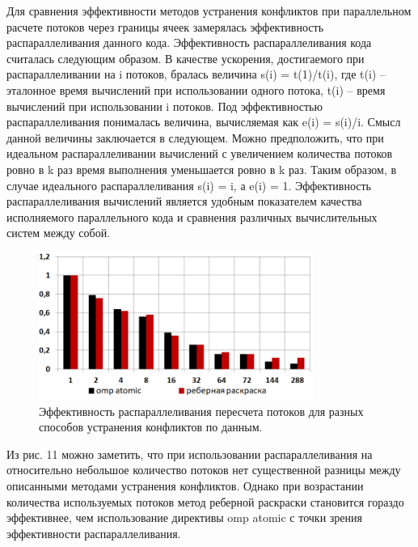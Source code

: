 Для сравнения эффективности методов устранения конфликтов при параллельном расчете потоков через границы ячеек замерялась эффективность распараллеливания данного кода.
Эффективность распараллеливания кода считалась следующим образом. В качестве ускорения, достигаемого при распараллеливании на i потоков, бралась величина s(i) = t(1)/t(i), где t(i) – эталонное время вычислений при использовании одного потока, t(i) – время вычислений при использовании i потоков.
Под эффективностью распараллеливания понималась величина, вычисляемая как e(i) = s(i)/i. Смысл данной величины заключается в следующем. Можно предположить, что при идеальном распараллеливании вычислений с увеличением количества потоков ровно в k раз время выполнения уменьшается ровно в k раз.
Таким образом, в случае идеального распараллеливания s(i) = i, а e(i) = 1. Эффективность распараллеливания вычислений является удобным показателем качества исполняемого параллельного кода и сравнения различных вычислительных систем между собой.

\begin{figure}[ht]
	\centering
		\includegraphics[width=0.8\textwidth]{./pics/text_3_edge_coloring/11-chart.png}
	\caption{Эффективность распараллеливания пересчета потоков для разных способов устранения конфликтов по данным.}
	\label{fig:text_3_edge_coloring_11}
\end{figure}

Из рис. 11 можно заметить, что при использовании распараллеливания на относительно небольшое количество потоков нет существенной разницы между описанными методами устранения конфликтов.
Однако при возрастании количества используемых потоков метод реберной раскраски становится гораздо эффективнее, чем использование директивы omp atomic с точки зрения эффективности распараллеливания.

